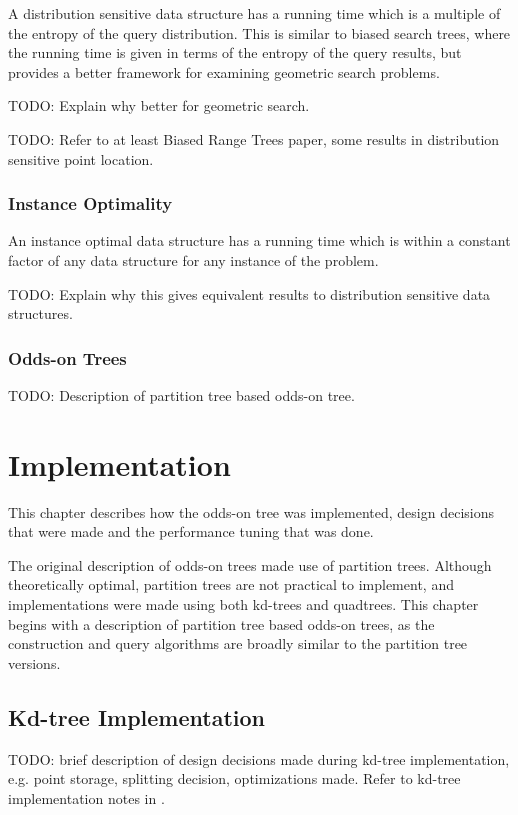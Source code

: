 \documentclass[mcs]{scsthesis}
\begin{document}
A distribution sensitive data structure has a running time which is a multiple 
of the entropy of the query distribution.  This is similar to biased search
trees, where the running time is given in terms of the entropy of the query
results, but provides a better framework for examining geometric search
problems.

TODO: Explain why better for geometric search.

TODO: Refer to at least Biased Range Trees paper, some results in distribution
sensitive point location.

\subsection{Instance Optimality}

An instance optimal data structure \cite{chan} has a running time which is
within a constant factor of any data structure for any instance of the problem.

TODO: Explain why this gives equivalent results to distribution sensitive data
structures.


\subsection{Odds-on Trees}

TODO: Description of partition tree based odds-on tree.


\chapter{Implementation}

This chapter describes how the odds-on tree was implemented, design decisions
that were made and the performance tuning that was done.

The original description of odds-on trees made use of partition trees.  Although
theoretically optimal, partition trees are not practical to implement, and
implementations were made using both kd-trees and quadtrees.  This chapter
begins with a description of partition tree based odds-on trees, as the
construction and query algorithms are broadly similar to the partition tree
versions.

\section{Kd-tree Implementation}

TODO: brief description of design decisions made during kd-tree implementation,
e.g. point storage, splitting decision, optimizations made.   Refer to 
kd-tree implementation notes in \cite{physicallybasedrendering}.
\end{document}
